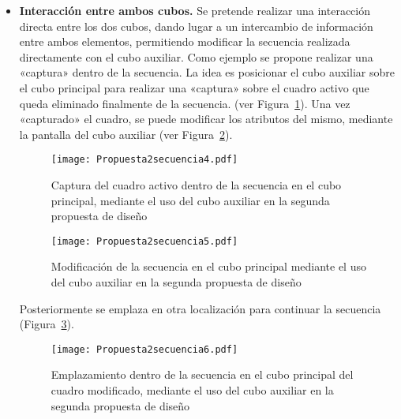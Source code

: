 \begin{itemize}
\item \textbf{Interacción entre ambos cubos.} Se pretende realizar una interacción directa entre los dos cubos, dando lugar a un intercambio de información entre ambos elementos, permitiendo modificar la secuencia realizada directamente con el cubo auxiliar. Como ejemplo se propone realizar una «captura» dentro de la secuencia. La idea es posicionar el cubo auxiliar sobre el cubo principal para realizar una «captura» sobre el cuadro activo que queda eliminado finalmente de la secuencia. (ver Figura~\ref{fig:Propuesta2secuencia4}). Una vez «capturado» el cuadro, se puede modificar los atributos del mismo, mediante la pantalla del cubo auxiliar (ver Figura~\ref{fig:Propuesta2secuencia5}).

\begin{figure}[!h]
\begin{center}
\texttt{[image: Propuesta2secuencia4.pdf]}
\caption{Captura del cuadro activo dentro de la secuencia en el cubo principal, mediante el uso del cubo auxiliar en la segunda propuesta de diseño}
\label{fig:Propuesta2secuencia4}
\end{center}
\end{figure}

\begin{figure}[!h]
\begin{center}
\texttt{[image: Propuesta2secuencia5.pdf]}
\caption{Modificación de la secuencia en el cubo principal mediante el uso del cubo auxiliar en la segunda propuesta de diseño}
\label{fig:Propuesta2secuencia5}
\end{center}
\end{figure}

Posteriormente se emplaza en otra localización para continuar la secuencia (Figura~\ref{fig:Propuesta2secuencia6}).

\begin{figure}[!h]
\begin{center}
\texttt{[image: Propuesta2secuencia6.pdf]}
\caption{Emplazamiento dentro de la secuencia en el cubo principal del cuadro modificado, mediante el uso del cubo auxiliar en la segunda propuesta de diseño}
\label{fig:Propuesta2secuencia6}
\end{center}
\end{figure}

\end{itemize}



